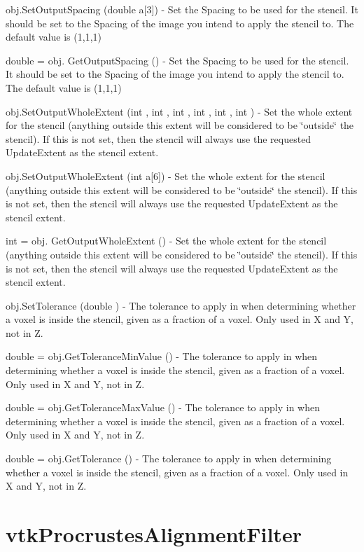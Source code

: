 \begin{DoxyItemize}
\item {\ttfamily obj.\-Set\-Output\-Spacing (double a\mbox{[}3\mbox{]})} -\/ Set the Spacing to be used for the stencil. It should be set to the Spacing of the image you intend to apply the stencil to. The default value is (1,1,1)  
\item {\ttfamily double = obj. Get\-Output\-Spacing ()} -\/ Set the Spacing to be used for the stencil. It should be set to the Spacing of the image you intend to apply the stencil to. The default value is (1,1,1)  
\item {\ttfamily obj.\-Set\-Output\-Whole\-Extent (int , int , int , int , int , int )} -\/ Set the whole extent for the stencil (anything outside this extent will be considered to be \char`\"{}outside\char`\"{} the stencil). If this is not set, then the stencil will always use the requested Update\-Extent as the stencil extent.  
\item {\ttfamily obj.\-Set\-Output\-Whole\-Extent (int a\mbox{[}6\mbox{]})} -\/ Set the whole extent for the stencil (anything outside this extent will be considered to be \char`\"{}outside\char`\"{} the stencil). If this is not set, then the stencil will always use the requested Update\-Extent as the stencil extent.  
\item {\ttfamily int = obj. Get\-Output\-Whole\-Extent ()} -\/ Set the whole extent for the stencil (anything outside this extent will be considered to be \char`\"{}outside\char`\"{} the stencil). If this is not set, then the stencil will always use the requested Update\-Extent as the stencil extent.  
\item {\ttfamily obj.\-Set\-Tolerance (double )} -\/ The tolerance to apply in when determining whether a voxel is inside the stencil, given as a fraction of a voxel. Only used in X and Y, not in Z.  
\item {\ttfamily double = obj.\-Get\-Tolerance\-Min\-Value ()} -\/ The tolerance to apply in when determining whether a voxel is inside the stencil, given as a fraction of a voxel. Only used in X and Y, not in Z.  
\item {\ttfamily double = obj.\-Get\-Tolerance\-Max\-Value ()} -\/ The tolerance to apply in when determining whether a voxel is inside the stencil, given as a fraction of a voxel. Only used in X and Y, not in Z.  
\item {\ttfamily double = obj.\-Get\-Tolerance ()} -\/ The tolerance to apply in when determining whether a voxel is inside the stencil, given as a fraction of a voxel. Only used in X and Y, not in Z.  
\end{DoxyItemize}\hypertarget{vtkhybrid_vtkprocrustesalignmentfilter}{}\section{vtk\-Procrustes\-Alignment\-Filter}\label{vtkhybrid_vtkprocrustesalignmentfilter}
